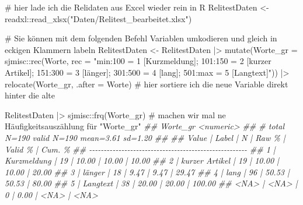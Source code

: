 \documentclass[twoside, pagesize, fontsize=11pt, dvipsnames]{scrreport}
\newenvironment{Shaded}{\begin{snugshade}}{\end{snugshade}}
\newcommand{\AttributeTok}[1]{\textcolor[rgb]{0.40,0.45,0.13}{#1}}
\newcommand{\CommentTok}[1]{\textcolor[rgb]{0.37,0.37,0.37}{#1}}
\newcommand{\DocumentationTok}[1]{\textcolor[rgb]{0.37,0.37,0.37}{\textit{#1}}}
\newcommand{\FunctionTok}[1]{\textcolor[rgb]{0.28,0.35,0.67}{#1}}
\newcommand{\NormalTok}[1]{\textcolor[rgb]{0.00,0.23,0.31}{#1}}
\newcommand{\OtherTok}[1]{\textcolor[rgb]{0.00,0.23,0.31}{#1}}
\newcommand{\SpecialCharTok}[1]{\textcolor[rgb]{0.37,0.37,0.37}{#1}}
\newcommand{\StringTok}[1]{\textcolor[rgb]{0.13,0.47,0.30}{#1}}
\begin{document}
\begin{Shaded}
\begin{Highlighting}[]
\CommentTok{\# hier lade ich die Relidaten aus Excel wieder rein in R}
\NormalTok{RelitestDaten }\OtherTok{\textless{}{-}}\NormalTok{ readxl}\SpecialCharTok{::}\FunctionTok{read\_xlsx}\NormalTok{(}\StringTok{"Daten/Relitest\_bearbeitet.xlsx"}\NormalTok{)}

\CommentTok{\# Sie können mit dem folgenden Befehl Variablen umkodieren und gleich in eckigen Klammern labeln }
\NormalTok{RelitestDaten }\OtherTok{\textless{}{-}}\NormalTok{ RelitestDaten }\SpecialCharTok{|\textgreater{}} 
  \FunctionTok{mutate}\NormalTok{(}\AttributeTok{Worte\_gr =}\NormalTok{ sjmisc}\SpecialCharTok{::}\FunctionTok{rec}\NormalTok{(Worte, }\AttributeTok{rec =} 
                       \StringTok{"min:100 = 1 [Kurzmeldung]; }
\StringTok{                        101:150 = 2 [kurzer Artikel]; }
\StringTok{                        151:300 = 3 [länger]; }
\StringTok{                        301:500 = 4 [lang]; }
\StringTok{                        501:max = 5 [Langtext]"}\NormalTok{)) }\SpecialCharTok{|\textgreater{}} 
    \FunctionTok{relocate}\NormalTok{(Worte\_gr, }\AttributeTok{.after =}\NormalTok{ Worte) }\CommentTok{\# hier sortiere ich die neue Variable direkt hinter die alte}

\NormalTok{RelitestDaten }\SpecialCharTok{|\textgreater{}} 
\NormalTok{  sjmisc}\SpecialCharTok{::}\FunctionTok{frq}\NormalTok{(Worte\_gr) }\CommentTok{\# machen wir mal ne Häufigkeitsauszählung für "Worte\_gr"}
\DocumentationTok{\#\# Worte\_gr \textless{}numeric\textgreater{} }
\DocumentationTok{\#\# \# total N=190 valid N=190 mean=3.61 sd=1.20}
\DocumentationTok{\#\# }
\DocumentationTok{\#\# Value |          Label |  N | Raw \% | Valid \% | Cum. \%}
\DocumentationTok{\#\# {-}{-}{-}{-}{-}{-}{-}{-}{-}{-}{-}{-}{-}{-}{-}{-}{-}{-}{-}{-}{-}{-}{-}{-}{-}{-}{-}{-}{-}{-}{-}{-}{-}{-}{-}{-}{-}{-}{-}{-}{-}{-}{-}{-}{-}{-}{-}{-}{-}{-}{-}{-}{-}{-}}
\DocumentationTok{\#\#     1 |    Kurzmeldung | 19 | 10.00 |   10.00 |  10.00}
\DocumentationTok{\#\#     2 | kurzer Artikel | 19 | 10.00 |   10.00 |  20.00}
\DocumentationTok{\#\#     3 |         länger | 18 |  9.47 |    9.47 |  29.47}
\DocumentationTok{\#\#     4 |           lang | 96 | 50.53 |   50.53 |  80.00}
\DocumentationTok{\#\#     5 |       Langtext | 38 | 20.00 |   20.00 | 100.00}
\DocumentationTok{\#\#  \textless{}NA\textgreater{} |           \textless{}NA\textgreater{} |  0 |  0.00 |    \textless{}NA\textgreater{} |   \textless{}NA\textgreater{}}


\end{Highlighting}
\end{Shaded}
\end{document}
